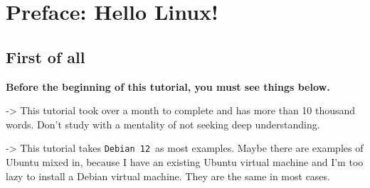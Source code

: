 \documentclass[12pt]{ctexart}
\begin{document}
\begin{titlepage}
    \centering
    \vspace*{96pt}
    \fontsize{26}{31.2}\selectfont{Introdution to Linux}\par %
    \vspace{39pt}
    \fontsize{22}{26.4}\selectfont{\haettenfont v2. 0\normalfont}\par %
    \vspace{52.8pt}
    \fontsize{18}{21.6}\par %
    \fontsize{18}{21.6}\selectfont{Last Edited on: Feb 26th, 2025}\par %
    \vfill
\end{titlepage}

\newpage
\thispagestyle{empty}
\small
\tableofcontents
\newpage
\setcounter{page}{1}

\fancyhf{}
\fancyhead[C]{ }
\fancyfoot[C]{\bfseries\thepage}

\newpage
\titleformat{\section}[block]{\normalfont\Large\bfseries\centering}{}{0pt}{}
\section*{\textbf{Preface: Hello Linux!}}

\subsection*{\textbf{First of all}}
\textbf{Before the beginning of this tutorial, you must see things
below.}

-> This tutorial took over a month to complete and has more than 10
thousand words. Don't study with a mentality of not
seeking deep understanding.

-> This tutorial takes \texttt{Debian\ 12}\ as most examples. Maybe there
are examples of Ubuntu mixed in, because I have an existing Ubuntu
virtual machine and I'm too lazy to install a Debian
virtual machine. They are the same in most cases.
\end{document}
